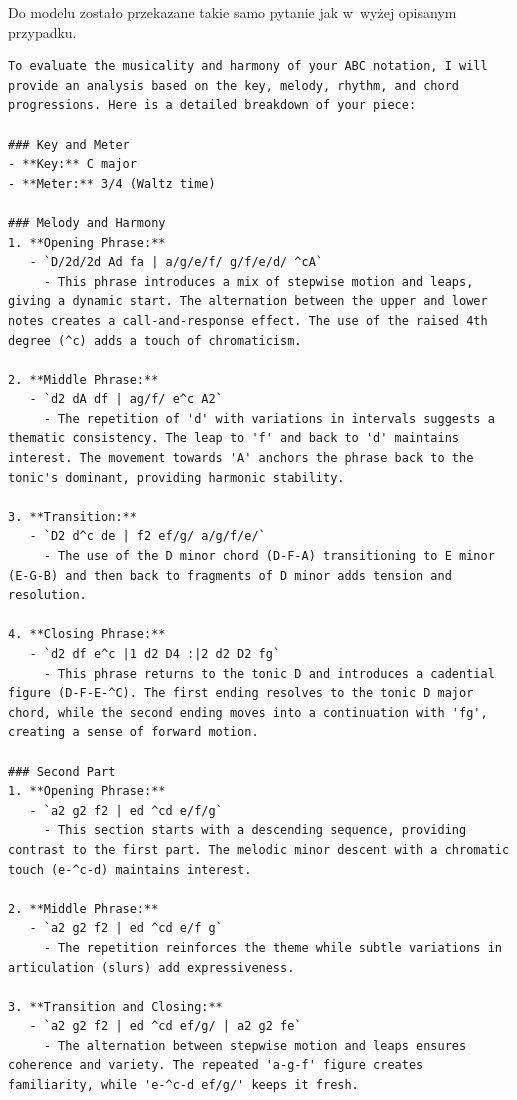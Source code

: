 \documentclass[data-science]{agh-wi} %
\begin{document}
Do modelu zostało przekazane takie samo pytanie jak w~wyżej opisanym przypadku.
\begin{verbatim}
To evaluate the musicality and harmony of your ABC notation, I will provide an analysis based on the key, melody, rhythm, and chord progressions. Here is a detailed breakdown of your piece:

### Key and Meter
- **Key:** C major
- **Meter:** 3/4 (Waltz time)

### Melody and Harmony
1. **Opening Phrase:**
   - `D/2d/2d Ad fa | a/g/e/f/ g/f/e/d/ ^cA`
     - This phrase introduces a mix of stepwise motion and leaps, giving a dynamic start. The alternation between the upper and lower notes creates a call-and-response effect. The use of the raised 4th degree (^c) adds a touch of chromaticism.

2. **Middle Phrase:**
   - `d2 dA df | ag/f/ e^c A2`
     - The repetition of 'd' with variations in intervals suggests a thematic consistency. The leap to 'f' and back to 'd' maintains interest. The movement towards 'A' anchors the phrase back to the tonic's dominant, providing harmonic stability.

3. **Transition:**
   - `D2 d^c de | f2 ef/g/ a/g/f/e/`
     - The use of the D minor chord (D-F-A) transitioning to E minor (E-G-B) and then back to fragments of D minor adds tension and resolution.

4. **Closing Phrase:**
   - `d2 df e^c |1 d2 D4 :|2 d2 D2 fg`
     - This phrase returns to the tonic D and introduces a cadential figure (D-F-E-^C). The first ending resolves to the tonic D major chord, while the second ending moves into a continuation with 'fg', creating a sense of forward motion.

### Second Part
1. **Opening Phrase:**
   - `a2 g2 f2 | ed ^cd e/f/g`
     - This section starts with a descending sequence, providing contrast to the first part. The melodic minor descent with a chromatic touch (e-^c-d) maintains interest.

2. **Middle Phrase:**
   - `a2 g2 f2 | ed ^cd e/f g`
     - The repetition reinforces the theme while subtle variations in articulation (slurs) add expressiveness.

3. **Transition and Closing:**
   - `a2 g2 f2 | ed ^cd ef/g/ | a2 g2 fe`
     - The alternation between stepwise motion and leaps ensures coherence and variety. The repeated 'a-g-f' figure creates familiarity, while 'e-^c-d ef/g/' keeps it fresh.


\end{verbatim}
\end{document}
